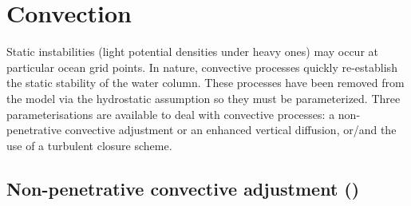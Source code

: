 \documentclass[../main/NEMO_manual]{subfiles}
\begin{document}
\section{Convection}
\label{sec:ZDF_conv}



Static instabilities (\ie light potential densities under heavy ones) may occur at particular ocean grid points.
In nature, convective processes quickly re-establish the static stability of the water column.
These processes have been removed from the model via the hydrostatic assumption so they must be parameterized.
Three parameterisations are available to deal with convective processes:
a non-penetrative convective adjustment or an enhanced vertical diffusion,
or/and the use of a turbulent closure scheme.

\subsection[Non-penetrative convective adjmt (\protect\np{ln\_tranpc}\forcode{ = .true.})]
				{Non-penetrative convective adjustment (\protect{})}
\label{subsec:ZDF_npc}


\end{document}

